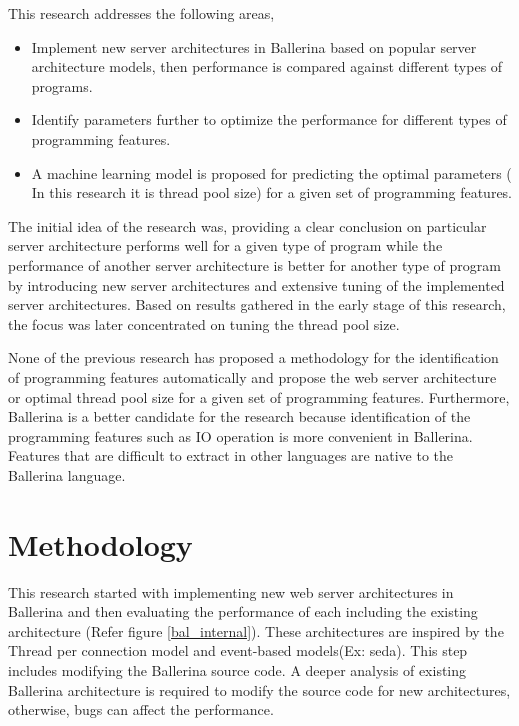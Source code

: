  This research addresses the following areas,
 
 \begin{itemize}
 	\item Implement new server architectures in Ballerina based on popular server architecture models, then performance is compared against different types of programs.
 	\item Identify parameters further to optimize the performance for different types of programming features. 
 	\item A machine learning model is proposed for predicting the optimal parameters ( In this research it is thread pool size) for a given set of programming features.
 \end{itemize}
 
  The initial idea of the research was, providing a clear conclusion on particular server architecture performs well for a given type of program while the performance of another server architecture is better for another type of program by introducing new server architectures and extensive tuning of the implemented server architectures. Based on results gathered in the early stage of this research, the focus was later concentrated on tuning the thread pool size.
 
 None of the previous research has proposed a methodology for the identification of programming features automatically and propose the web server architecture or optimal thread pool size for a given set of programming features. Furthermore, Ballerina is a better candidate for the research because identification of the programming features such as IO operation is more convenient in Ballerina. Features that are difficult to extract in other languages are native to the Ballerina language. 
 

\section{Methodology}

	This research started with implementing new web server architectures in Ballerina and then evaluating the performance of each including the existing architecture (Refer figure \ref{bal_internal}). These architectures are inspired by the Thread per connection model and event-based models(Ex: \acrshort{seda}). This step includes modifying the Ballerina source code. A deeper analysis of existing Ballerina architecture is required to modify the source code for new architectures, otherwise, bugs can affect the performance. 
	
